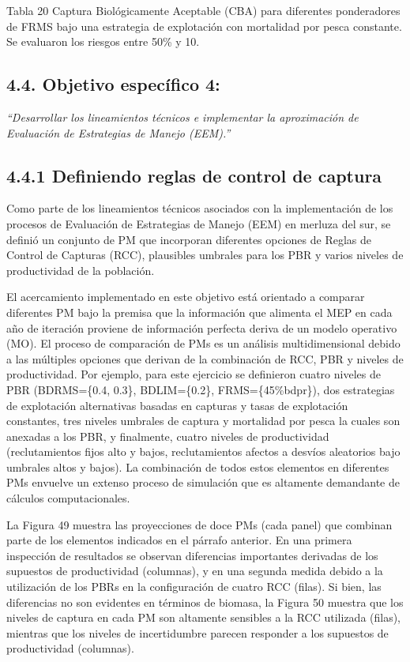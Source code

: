 \documentclass[
  spanish,
]{article}
\begin{document}
Tabla 20 Captura Biológicamente Aceptable (CBA) para diferentes
ponderadores de FRMS bajo una estrategia de explotación con mortalidad
por pesca constante. Se evaluaron los riesgos entre 50\% y 10.

\hypertarget{objetivo-especuxedfico-4-1}{%
\subsection{4.4. Objetivo específico
4:}\label{objetivo-especuxedfico-4-1}}

\emph{``Desarrollar los lineamientos técnicos e implementar la
aproximación de Evaluación de Estrategias de Manejo (EEM).''}

\hypertarget{definiendo-reglas-de-control-de-captura}{%
\subsection{4.4.1 Definiendo reglas de control de
captura}\label{definiendo-reglas-de-control-de-captura}}

Como parte de los lineamientos técnicos asociados con la implementación
de los procesos de Evaluación de Estrategias de Manejo (EEM) en merluza
del sur, se definió un conjunto de PM que incorporan diferentes opciones
de Reglas de Control de Capturas (RCC), plausibles umbrales para los PBR
y varios niveles de productividad de la población.

El acercamiento implementado en este objetivo está orientado a comparar
diferentes PM bajo la premisa que la información que alimenta el MEP en
cada año de iteración proviene de información perfecta deriva de un
modelo operativo (MO). El proceso de comparación de PMs es un análisis
multidimensional debido a las múltiples opciones que derivan de la
combinación de RCC, PBR y niveles de productividad. Por ejemplo, para
este ejercicio se definieron cuatro niveles de PBR (BDRMS=\{0.4, 0.3\},
BDLIM=\{0.2\}, FRMS=\{45\%bdpr\}), dos estrategias de explotación
alternativas basadas en capturas y tasas de explotación constantes, tres
niveles umbrales de captura y mortalidad por pesca la cuales son
anexadas a los PBR, y finalmente, cuatro niveles de productividad
(reclutamientos fijos alto y bajos, reclutamientos afectos a desvíos
aleatorios bajo umbrales altos y bajos). La combinación de todos estos
elementos en diferentes PMs envuelve un extenso proceso de simulación
que es altamente demandante de cálculos computacionales.

La Figura 49 muestra las proyecciones de doce PMs (cada panel) que
combinan parte de los elementos indicados en el párrafo anterior. En una
primera inspección de resultados se observan diferencias importantes
derivadas de los supuestos de productividad (columnas), y en una segunda
medida debido a la utilización de los PBRs en la configuración de cuatro
RCC (filas). Si bien, las diferencias no son evidentes en términos de
biomasa, la Figura 50 muestra que los niveles de captura en cada PM son
altamente sensibles a la RCC utilizada (filas), mientras que los niveles
de incertidumbre parecen responder a los supuestos de productividad
(columnas).
\end{document}
